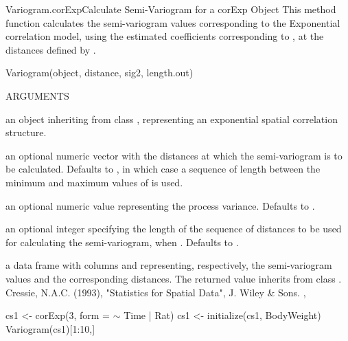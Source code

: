 \documentclass[pdftex]{article} \usepackage{url,graphicx}
\renewcommand{\Twiddle}{\mbox{\(\sim\)}}
\begin{document}
\begin{Helpfile}{Variogram.corExp}{Calculate Semi-Variogram for a corExp Object}
  This method function calculates the semi-variogram values
  corresponding to the Exponential correlation model, using the
  estimated coefficients corresponding to , at the
  distances defined by .
\begin{Example}
Variogram(object, distance, sig2, length.out)
\end{Example}
\begin{Argument}{ARGUMENTS}
\item[\Co{object:}]
an object inheriting from class ,
representing an exponential spatial correlation structure.
\item[\Co{distance:}]
an optional numeric vector with the distances at
which the semi-variogram is to be calculated. Defaults to
, in which case a sequence of length 
between the minimum and maximum values of
 is used.
\item[\Co{sig2:}]
an optional numeric value representing the process
variance. Defaults to .
\item[\Co{length.out:}]
an optional integer specifying the length of the
sequence of distances to be used for calculating the semi-variogram,
when . Defaults to .
\end{Argument}
a data frame with columns  and  representing,
respectively, the semi-variogram values and the corresponding
distances. The returned value inherits from class .
Cressie, N.A.C. (1993), "Statistics for Spatial Data", J. Wiley \& Sons.
, 
\need 15pt
\vspace{-16pt}
\begin{Example}
cs1 <- corExp(3, form = {\Twiddle} Time | Rat)
cs1 <- initialize(cs1, BodyWeight)
Variogram(cs1)[1:10,]
\end{Example}
\end{Helpfile}
\end{document}
